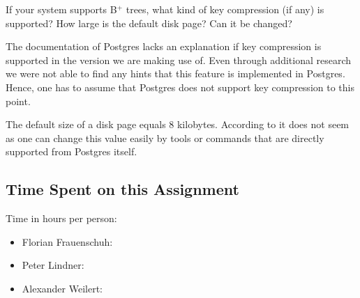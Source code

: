 \documentclass[11pt]{scrartcl}
\begin{document}
If your system supports B$^+$ trees, what kind of key compression (if any) is supported?
How large is the default disk page?
Can it be changed?

The documentation of Postgres lacks an explanation if key compression is supported in the version we are making use of.
Even through additional research we were not able to find any hints that this feature is implemented in Postgres.
Hence, one has to assume that Postgres does not support key compression to this point.

The default size of a disk page equals 8 kilobytes.
According to \cite{PostgreSQL2024DiskUsage} it does not seem as one can change this value easily by tools or commands
that are directly supported from Postgres itself.

\subsection*{Time Spent on this Assignment}

Time in hours per person:
\begin{itemize}
  \item Florian Frauenschuh: \textbf{}
  \item Peter Lindner: \textbf{}
  \item Alexander Weilert: \textbf{}
\end{itemize}

\pagebreak

\printbibliography[title=References]
\end{document}
